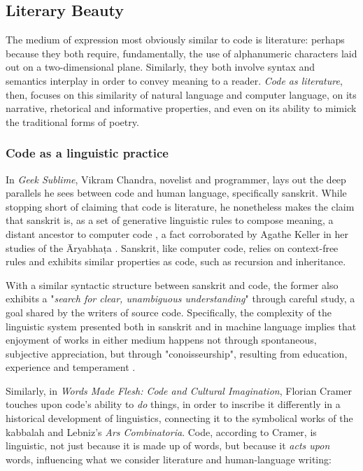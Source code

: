 \subsection{Literary Beauty}
\label{subsec:literary-beauty}

The medium of expression most obviously similar to code is literature: perhaps because they both require, fundamentally, the use of alphanumeric characters laid out on a two-dimensional plane. Similarly, they both involve syntax and semantics interplay in order to convey meaning to a reader. \emph{Code as literature}, then, focuses on this similarity of natural language and computer language, on its narrative, rhetorical and informative properties, and even on its ability to mimick the traditional forms of poetry.

\subsubsection{Code as a linguistic practice}
\label{subsubsec:code-linguistic}

In \emph{Geek Sublime}, Vikram Chandra, novelist and programmer, lays out the deep parallels he sees between code and human language, specifically sanskrit. While stopping short of claiming that code is literature, he nonetheless makes the claim that sanskrit is, as a set of generative linguistic rules to compose meaning, a distant ancestor to computer code \citep{chandra_geek_2014}, a fact corroborated by Agathe Keller in her studies of the Āryabhaṭa \citep{keller_textes_2021}. Sanskrit, like computer code, relies on context-free rules and exhibits similar properties as code, such as recursion and inheritance.

With a similar syntactic structure between sanskrit and code, the former also exhibits a "\emph{search for clear, unambiguous understanding}" through careful study, a goal shared by the writers of source code. Specifically, the complexity of the linguistic system presented both in sanskrit and in machine language implies that enjoyment of works in either medium happens not through spontaneous, subjective appreciation, but through "conoisseurship", resulting from education, experience and temperament \citep{chandra_geek_2014}.

Similarly, in \emph{Words Made Flesh: Code and Cultural Imagination}, Florian Cramer touches upon code's ability to \emph{do} things, in order to inscribe it differently in a historical development of linguistics, connecting it to the symbolical works of the kabbalah and Lebniz's \emph{Ars Combinatoria}. Code, according to Cramer, is linguistic, not just because it is made up of words, but because it \emph{acts upon} words, influencing what we consider literature and human-language writing:


